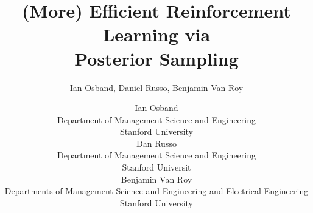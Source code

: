 \documentclass[10pt]{article}
\title{(More) Efficient Reinforcement Learning via \\ Posterior Sampling}
\author{Ian Osband, Daniel Russo, Benjamin Van Roy}
\author{
Ian Osband \\
Department of Management Science and Engineering\\
Stanford University \\
\And
Dan Russo \\
Department of Management Science and Engineering \\
Stanford Universit \\
\AND
Benjamin Van Roy \\
Departments of Management Science and Engineering and Electrical Engineering \\
Stanford University \\
}
\begin{document}
\maketitle

















\newpage

\small{


}

\newpage

\end{document}
